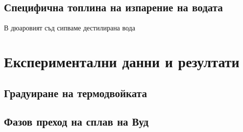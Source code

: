 \documentclass[%
 reprint,
 amsmath,amssymb,
 aps,
]{revtex4-2}
\begin{document}
\subsection{Специфична топлина на изпарение на водата}
В дюаровият съд сипваме дестилирана вода 

\section{Експериментални данни и резултати}

\subsection{Градуиране на термодвойката}

\subsection{Фазов преход на сплав на Вуд}
\end{document}
